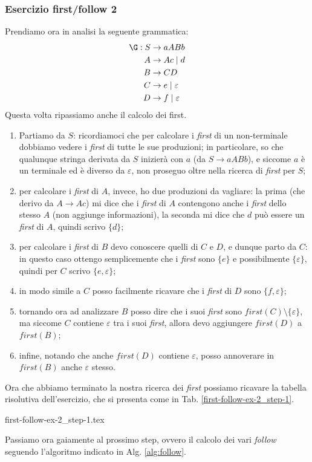 \documentclass[class=book, crop=false, oneside, 12pt]{standalone}
\begin{document}
\subsubsection{Esercizio first/follow 2}
\label{first-follow-ex-2}
Prendiamo ora in analisi la seguente grammatica:
\begin{align*}
       \G: S &\to aABb \\
       A &\to Ac \mid d \\
       B &\to CD \\
       C &\to e \mid \varepsilon \\
       D &\to f \mid \varepsilon
\end{align*}
Questa volta ripassiamo anche il calcolo dei first.
\begin{enumerate}
    \item Partiamo da \(S\): ricordiamoci che per calcolare i \emph{first} di un non-terminale dobbiamo vedere i \emph{first} di tutte le sue produzioni; in particolare, so che qualunque stringa derivata da \(S\) inizierà con \(a\) (da \(S \to aABb\)), e siccome \(a\) è un terminale ed è diverso da \(\varepsilon\), non proseguo oltre nella ricerca di \emph{first} per \(S\);
    \item per calcolare i \emph{first} di \(A\), invece, ho due produzioni da vagliare: la prima (che derivo da \(A \to Ac\)) mi dice che i \emph{first} di \(A\) contengono anche i \emph{first} dello stesso \(A\) (non aggiunge informazioni), la seconda mi dice che \(d\) può essere un \emph{first} di \(A\), quindi scrivo \(\{d\}\);
    \item per calcolare i \emph{first} di \(B\) devo conoscere quelli di \(C\) e \(D\), e dunque parto da \(C\): in questo caso ottengo semplicemente che i \emph{first} sono \(\{e\}\) e possibilmente \(\{\varepsilon\}\), quindi per \(C\) scrivo \(\{e, \varepsilon\}\);
    \item in modo simile a \(C\) posso facilmente ricavare che i \emph{first} di \(D\) sono \(\{f, \varepsilon\}\);
    \item tornando ora ad analizzare \(B\) posso dire che i suoi \emph{first} sono \(first(C) \setminus \{\varepsilon\}\), ma siccome \(C\) contiene \(\varepsilon\) tra i suoi \emph{first}, allora devo aggiungere \(first(D)\) a \(first(B)\);
    \item infine, notando che anche \(first(D)\) contiene \(\varepsilon\), posso annoverare in \(first(B)\) anche \(\varepsilon\) stesso.    
\end{enumerate}
Ora che abbiamo terminato la nostra ricerca dei \emph{first} possiamo ricavare la tabella risolutiva dell'esercizio, che si presenta come in Tab. \ref{first-follow-ex-2_step-1}.
\begin{table}[H]
	\centering
	{first-follow-ex-2_step-1.tex}
    \caption{Esercizio \ref{first-follow-ex-2} su first/follow, step 1}
    \label{first-follow-ex-2_step-1}
\end{table}
Passiamo ora gaiamente al prossimo step, ovvero il calcolo dei vari \emph{follow} seguendo l'algoritmo indicato in Alg. \ref{alg:follow}.
\end{document}
